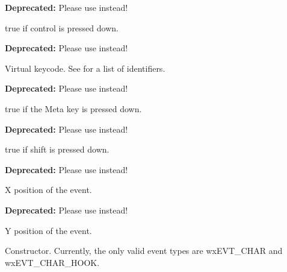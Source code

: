 
\textbf{Deprecated: } Please use 
instead!

true if control is pressed down.


\label{wxkeyeventmkeycode}


\textbf{Deprecated: } Please use 
instead!

Virtual keycode. See  for a list of identifiers.


\label{wxkeyeventmmetadown}


\textbf{Deprecated: } Please use 
instead!

true if the Meta key is pressed down.


\label{wxkeyeventmshiftdown}


\textbf{Deprecated: } Please use 
instead!

true if shift is pressed down.


\label{wxkeyeventmx}


\textbf{Deprecated: } Please use  instead!

X position of the event.


\label{wxkeyeventmy}


\textbf{Deprecated: } Please use  instead!

Y position of the event.


\label{wxkeyeventctor}


Constructor. Currently, the only valid event types are wxEVT\_CHAR and wxEVT\_CHAR\_HOOK.


\label{wxkeyeventaltdown}


